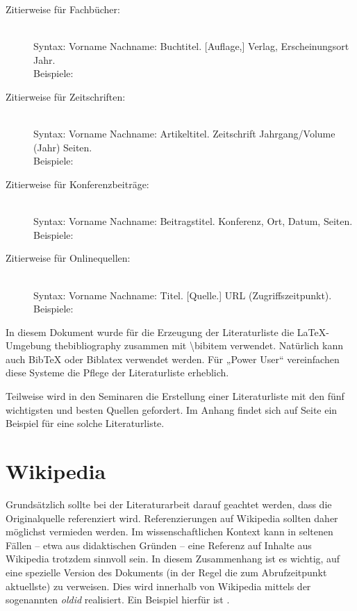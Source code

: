 \documentclass[
    12pt,
    headings=small,
    parskip=half,           %
    bibliography=totoc,
    numbers=noenddot,       %
    open=any,               %
    ]{scrreprt}
\begin{document}
\begin{description}

	\item[Zitierweise für Fachbücher:] \mbox{}\\[1ex]
	Syntax: Vorname Nachname: Buchtitel. {[}Auflage,{]} Verlag, Erscheinungsort Jahr. \\[1ex]
	Beispiele: \cite{Beut2009,ScWe2007}
	
	\item[Zitierweise für Zeitschriften:] \mbox{}\\[1ex]
	Syntax: Vorname Nachname: Artikeltitel. Zeitschrift Jahrgang/Volume (Jahr) Seiten. \\[1ex]
	Beispiele: \cite{Kili2006,Lamp1981} 

	\item[Zitierweise für Konferenzbeiträge:] \mbox{}\\[1ex]
	Syntax: Vorname Nachname: Beitragstitel. Konferenz, Ort, Datum, Seiten. \\[1ex]
	Beispiele: \cite{InBr2009,WWPK2010,HSFN2009}

	\item[Zitierweise für Onlinequellen:] \mbox{}\\[1ex]
	Syntax: Vorname Nachname: Titel. {[}Quelle.{]} URL (Zugriffszeitpunkt). \\[1ex]
	Beispiele: \cite{CCC2009,Heise2011,textwahrnehmung} 

\end{description}

In diesem Dokument wurde für die Erzeugung der Literaturliste die LaTeX-Umgebung thebibliography zusammen mit \textbackslash{bibitem} verwendet. Natürlich kann auch BibTeX oder Biblatex verwendet werden. Für „Power User“ vereinfachen diese Systeme die Pflege der Literaturliste erheblich.

Teilweise wird in den Seminaren die Erstellung einer Literaturliste mit den fünf wichtigsten und besten Quellen gefordert. Im Anhang findet sich auf Seite \pageref{sec:literaturliste} ein Beispiel für eine solche Literaturliste.

\section{Wikipedia}

Grundsätzlich sollte bei der Literaturarbeit darauf geachtet werden, dass die Originalquelle 
referenziert wird. Referenzierungen auf Wikipedia sollten daher möglichst vermieden werden. Im wissenschaftlichen Kontext kann in seltenen Fällen -- etwa aus didaktischen Gründen -- eine Referenz auf Inhalte aus Wikipedia trotzdem sinnvoll sein. In diesem Zusammenhang ist es wichtig, auf eine spezielle Version des Dokuments (in der Regel die zum Abrufzeitpunkt aktuellste) zu verweisen. Dies wird innerhalb von Wikipedia mittels der sogenannten \emph{oldid} realisiert. Ein Beispiel hierfür ist \cite{Wiki}.
\end{document}
